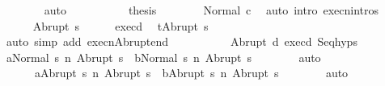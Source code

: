 \begin{isabellebody}
\ \ \ \ \ \ \isamarkupfalse%
\ auto\isanewline
\ \ \ \ \isamarkupfalse%
\isanewline
\ \ \ \ \isamarkupfalse%
\ {\isacharquery}thesis\isanewline
\ \ \ \ \ \ \isamarkupfalse%
\ Normal\ c{}\ \isamarkupfalse%
\ {\isacharparenleft}auto\ intro{\isacharcolon}\ execn{\isachardot}intros{\isacharparenright}\isanewline
\ \ \isamarkupfalse%
\isanewline
\ \ \ \ \isamarkupfalse%
\ {\isacharparenleft}Abrupt\ s{\isacharprime}{\isacharprime}{\isacharparenright}\isanewline
\ \ \ \ \isamarkupfalse%
\ exec{\isacharunderscore}d{}\ \isamarkupfalse%
\ {\isachardoublequoteopen}t{\isacharequal}Abrupt\ s{\isacharprime}{\isacharprime}{\isachardoublequoteclose}\isanewline
\ \ \ \ \ \ \isamarkupfalse%
\ {\isacharparenleft}auto\ simp\ add{\isacharcolon}\ execn{\isacharunderscore}Abrupt{\isacharunderscore}end{\isacharparenright}\isanewline
\ \ \ \ \isamarkupfalse%
\isanewline
\ \ \ \ \isamarkupfalse%
\ Abrupt\ d{}\ exec{\isacharunderscore}d{}\ Seq{\isachardot}hyps\isanewline
\ \ \ \ \isamarkupfalse%
\ {\isachardoublequoteopen}{\isasymGamma}{\isasymturnstile}{\isasymlangle}a{}{\isacharcomma}Normal\ s{\isasymrangle}\ {\isacharequal}n{\isasymRightarrow}\ Abrupt\ s{\isacharprime}{\isacharprime}{\isachardoublequoteclose}\ \ {\isachardoublequoteopen}{\isasymGamma}{\isasymturnstile}{\isasymlangle}b{}{\isacharcomma}Normal\ s{\isasymrangle}\ {\isacharequal}n{\isasymRightarrow}\ Abrupt\ s{\isacharprime}{\isacharprime}{\isachardoublequoteclose}\isanewline
\ \ \ \ \ \ \isamarkupfalse%
\ auto\isanewline
\ \ \ \ \isamarkupfalse%
\isanewline
\ \ \ \ \isamarkupfalse%
\ \isanewline
\ \ \ \ \ \ {\isachardoublequoteopen}{\isasymGamma}{\isasymturnstile}{\isasymlangle}a{}{\isacharcomma}Abrupt\ s{\isacharprime}{\isacharprime}{\isasymrangle}\ {\isacharequal}n{\isasymRightarrow}\ Abrupt\ s{\isacharprime}{\isacharprime}{\isachardoublequoteclose}\ \ {\isachardoublequoteopen}{\isasymGamma}{\isasymturnstile}{\isasymlangle}b{}{\isacharcomma}Abrupt\ s{\isacharprime}{\isacharprime}{\isasymrangle}\ {\isacharequal}n{\isasymRightarrow}\ Abrupt\ s{\isacharprime}{\isacharprime}{\isachardoublequoteclose}\isanewline
\ \ \ \ \ \ \isamarkupfalse%
\ auto\isanewline
\ \ \ \ \isamarkupfalse%

\end{isabellebody}
